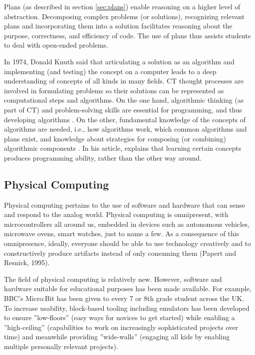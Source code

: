 Plans (as described in section \ref{sec:plans}) enable reasoning on a higher level of abstraction. Decomposing complex problems (or solutions), recognizing relevant plans and incorporating them into a solution facilitates reasoning about the purpose, correctness, and efficiency of code.  The use of plans thus assists students to deal with open-ended problems.

In 1974, Donald Knuth said that articulating a solution as an algorithm and implementing (and testing) the concept on a computer leads to a deep understanding of concepts of all kinds in many fields. CT thought processes are involved in formulating problems so their solutions can be represented as computational steps and algorithms\cite{aho2012computation}. On the one hand, algorithmic thinking (as part of CT) and problem-solving skills are essential for programming, and thus developing algorithms \cite{McCracken2001}. On the other, fundamental knowledge of the concepts of algorithms are needed, i.e., how algorithms work, which common algorithms and plans exist, and knowledge about strategies for composing (or combining) algorithmic components \cite{deRaadt2008}. In his article,  explains that learning certain concepts produces programming ability, rather than the other way around.








\subsection{Physical Computing}


Physical computing pertains to the use of software and hardware that can sense and respond to the analog world. Physical computing is omnipresent, with microcontrollers all around us, embedded in devices such as autonomous vehicles, microwave ovens, smart watches, just to name a few. As a consequence of this omnipresence, ideally, everyone should be able to use technology creatively and to constructively produce artifacts instead of only consuming them (Papert and Resnick, 1995).

The field of physical computing is relatively new. However, software and hardware suitable for educational purposes has been made available. For example, BBC's Micro:Bit has been given to every 7 or 8th grade student across the UK. To increase usability, block-based tooling including emulators has been developed to ensure ''low-floors'' (easy ways for novices to get started) while enabling a ''high-ceiling'' (capabilities to work on increasingly sophisticated projects over time) and meanwhile providing ''wide-walls'' (engaging all kids by enabling multiple personally relevant projects).




